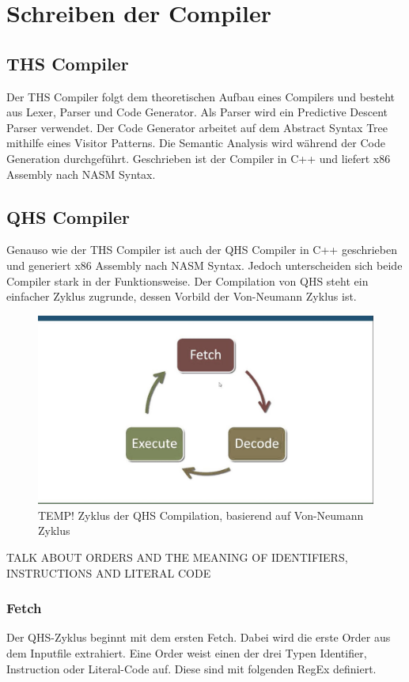 \chapter{Schreiben der Compiler}

\section{THS Compiler}
Der THS Compiler folgt dem theoretischen Aufbau eines Compilers und besteht aus Lexer, Parser und Code Generator. Als Parser wird ein Predictive Descent Parser verwendet.
Der Code Generator arbeitet auf dem Abstract Syntax Tree mithilfe eines Visitor Patterns. Die Semantic Analysis wird während der Code Generation durchgeführt. Geschrieben ist der Compiler in C++ und liefert x86 Assembly nach NASM Syntax.

\section{QHS Compiler}
Genauso wie der THS Compiler ist auch der QHS Compiler in C++ geschrieben und generiert x86 Assembly nach NASM Syntax.
Jedoch unterscheiden sich beide Compiler stark in der Funktionsweise. Der Compilation von QHS steht ein einfacher Zyklus zugrunde, dessen Vorbild der Von-Neumann Zyklus ist.

\begin{figure}[h!]
    \centering
    \includegraphics[scale=0.3]{resources/TEMP_von-neumann-cycle.jpg}
    \caption{TEMP! Zyklus der QHS Compilation, basierend auf Von-Neumann Zyklus}
    \label{fig:von-neumann-cycle}
\end{figure}

TALK ABOUT ORDERS AND THE MEANING OF IDENTIFIERS, INSTRUCTIONS AND LITERAL CODE

\subsection{Fetch}
Der QHS-Zyklus beginnt mit dem ersten Fetch. Dabei wird die erste Order aus dem Inputfile extrahiert. Eine Order weist einen der drei Typen Identifier, Instruction oder Literal-Code auf. Diese sind mit folgenden RegEx definiert.

